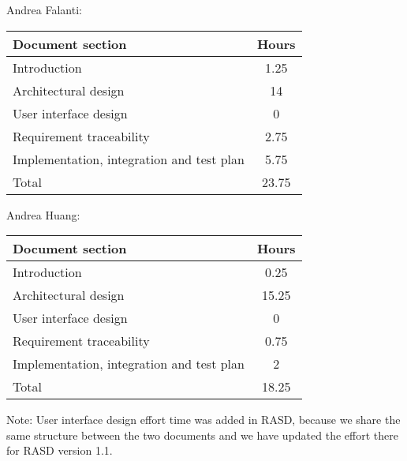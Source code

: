 Andrea Falanti:

\begin{tabular}{|l|c|}
    \hline
    Document section & Hours \\
    \hline
     Introduction & 1.25\\
     Architectural design & 14\\
     User interface design & 0\\
     Requirement traceability & 2.75\\
     Implementation, integration and test plan & 5.75\\
     \hline
     Total & 23.75\\
     \hline
\end{tabular}
\vskip 0.3in

Andrea Huang:

\begin{tabular}{|l|c|}
    \hline
    Document section & Hours \\
    \hline
     Introduction & 0.25\\
     Architectural design & 15.25\\
     User interface design & 0\\
     Requirement traceability & 0.75\\
     Implementation, integration and test plan & 2\\
     \hline
     Total & 18.25\\
     \hline
\end{tabular}

\bigskip
\bigskip
Note: User interface design effort time was added in RASD, because we share the same structure between the two documents and we have updated the effort there for RASD version 1.1. 